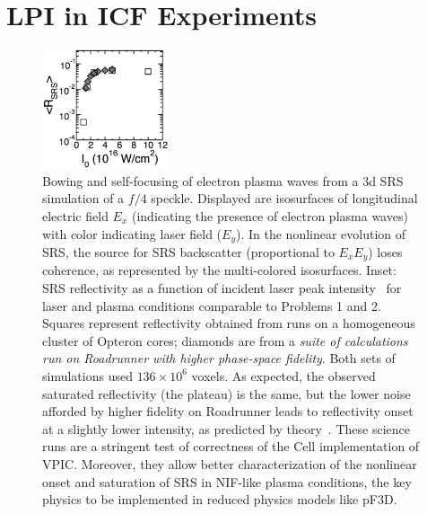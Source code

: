 \documentclass[journal,twoside]{IEEEtran}
\begin{document}
\section{LPI in ICF Experiments}

\begin{figure}
\begin{center}


\vspace{-1.5in}
\hspace{-5.25in}
\includegraphics[height=1.375in]{figs/lpi_comparison.eps}

\vspace{0.125in}
\caption{
Bowing and self-focusing of electron plasma waves from a 3d SRS
simulation of a $f/4$ speckle.  Displayed are isosurfaces of
longitudinal electric field $E_x$ (indicating the presence of electron
plasma waves) with color indicating laser field ($E_y$).  In the
nonlinear evolution of SRS, the source for SRS backscatter
(proportional to $E_x E_y$) loses coherence, as represented by the
multi-colored isosurfaces.  Inset: SRS reflectivity as a function of
incident laser peak intensity~\cite{AAC_Conference_Paper} for laser
and plasma conditions comparable to Problems 1 and 2.  Squares
represent reflectivity obtained from runs on a homogeneous cluster of
Opteron cores; diamonds are from a \textit{suite of calculations run
on Roadrunner with higher phase-space fidelity}.  Both sets of
simulations used $136 \times 10^6$ voxels.  As expected, the observed
saturated reflectivity (the plateau) is the same, but the lower noise
afforded by higher fidelity on Roadrunner leads to reflectivity onset
at a slightly lower intensity, as predicted by
theory~\cite{Yin_et_al_Phys_Plasmas_2006}.  These science runs are a
stringent test of correctness of the Cell implementation of VPIC.
Moreover, they allow better characterization of the nonlinear onset
and saturation of SRS in NIF-like plasma conditions, the key physics
to be implemented in reduced physics models like pF3D.}
\label{fig:lpi}
\end{center}
\end{figure}
\end{document}
